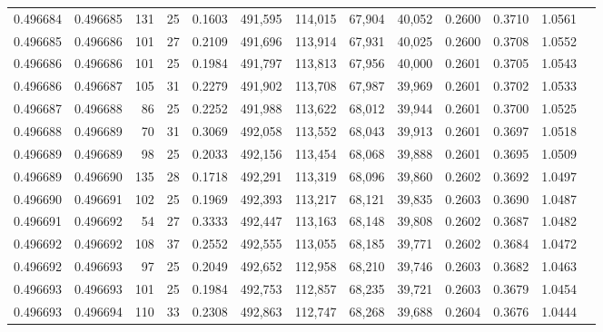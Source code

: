 \begin{tabular}{rrrrrrrrrrrrr}
0.496684 & 0.496685 & 131 &  25 &                                     0.1603 & 491,595 & 114,015 &  67,904 &  40,052 & 0.2600 & 0.3710 & 1.0561 \\
0.496685 & 0.496686 & 101 &  27 &                                     0.2109 & 491,696 & 113,914 &  67,931 &  40,025 & 0.2600 & 0.3708 & 1.0552 \\
0.496686 & 0.496686 & 101 &  25 &                                     0.1984 & 491,797 & 113,813 &  67,956 &  40,000 & 0.2601 & 0.3705 & 1.0543 \\
0.496686 & 0.496687 & 105 &  31 &                                     0.2279 & 491,902 & 113,708 &  67,987 &  39,969 & 0.2601 & 0.3702 & 1.0533 \\
0.496687 & 0.496688 &  86 &  25 &                                     0.2252 & 491,988 & 113,622 &  68,012 &  39,944 & 0.2601 & 0.3700 & 1.0525 \\
0.496688 & 0.496689 &  70 &  31 &                                     0.3069 & 492,058 & 113,552 &  68,043 &  39,913 & 0.2601 & 0.3697 & 1.0518 \\
0.496689 & 0.496689 &  98 &  25 &                                     0.2033 & 492,156 & 113,454 &  68,068 &  39,888 & 0.2601 & 0.3695 & 1.0509 \\
0.496689 & 0.496690 & 135 &  28 &                                     0.1718 & 492,291 & 113,319 &  68,096 &  39,860 & 0.2602 & 0.3692 & 1.0497 \\
0.496690 & 0.496691 & 102 &  25 &                                     0.1969 & 492,393 & 113,217 &  68,121 &  39,835 & 0.2603 & 0.3690 & 1.0487 \\
0.496691 & 0.496692 &  54 &  27 &                                     0.3333 & 492,447 & 113,163 &  68,148 &  39,808 & 0.2602 & 0.3687 & 1.0482 \\
0.496692 & 0.496692 & 108 &  37 &                                     0.2552 & 492,555 & 113,055 &  68,185 &  39,771 & 0.2602 & 0.3684 & 1.0472 \\
0.496692 & 0.496693 &  97 &  25 &                                     0.2049 & 492,652 & 112,958 &  68,210 &  39,746 & 0.2603 & 0.3682 & 1.0463 \\
0.496693 & 0.496693 & 101 &  25 &                                     0.1984 & 492,753 & 112,857 &  68,235 &  39,721 & 0.2603 & 0.3679 & 1.0454 \\
0.496693 & 0.496694 & 110 &  33 &                                     0.2308 & 492,863 & 112,747 &  68,268 &  39,688 & 0.2604 & 0.3676 & 1.0444 \\

\end{tabular}
